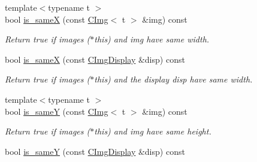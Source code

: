 \begin{DoxyCompactItemize}
\hypertarget{structcimg__library_1_1_c_img_af6159b79f4adb751936f93b5dd449ad0}{
{\footnotesize template$<$typename t $>$ }\\bool \hyperlink{structcimg__library_1_1_c_img_af6159b79f4adb751936f93b5dd449ad0}{is\_\-sameX} (const \hyperlink{structcimg__library_1_1_c_img}{CImg}$<$ t $>$ \&img) const }
\label{structcimg__library_1_1_c_img_af6159b79f4adb751936f93b5dd449ad0}

\begin{DoxyCompactList}\small\item\em Return {\ttfamily true} if images {\ttfamily }($\ast$this) and {\ttfamily img} have same width. \item\end{DoxyCompactList}\item 
\hypertarget{structcimg__library_1_1_c_img_af47030feb9d6fb87462ed939b7e45ea5}{
bool \hyperlink{structcimg__library_1_1_c_img_af47030feb9d6fb87462ed939b7e45ea5}{is\_\-sameX} (const \hyperlink{structcimg__library_1_1_c_img_display}{CImgDisplay} \&disp) const }
\label{structcimg__library_1_1_c_img_af47030feb9d6fb87462ed939b7e45ea5}

\begin{DoxyCompactList}\small\item\em Return {\ttfamily true} if images {\ttfamily }($\ast$this) and the display {\ttfamily disp} have same width. \item\end{DoxyCompactList}\item 
\hypertarget{structcimg__library_1_1_c_img_aad820536738d41afc41f67e50fba0237}{
{\footnotesize template$<$typename t $>$ }\\bool \hyperlink{structcimg__library_1_1_c_img_aad820536738d41afc41f67e50fba0237}{is\_\-sameY} (const \hyperlink{structcimg__library_1_1_c_img}{CImg}$<$ t $>$ \&img) const }
\label{structcimg__library_1_1_c_img_aad820536738d41afc41f67e50fba0237}

\begin{DoxyCompactList}\small\item\em Return {\ttfamily true} if images {\ttfamily }($\ast$this) and {\ttfamily img} have same height. \item\end{DoxyCompactList}\item 
\hypertarget{structcimg__library_1_1_c_img_aa686f35fb0e2a1d03ee7dc55fa97601d}{
bool \hyperlink{structcimg__library_1_1_c_img_aa686f35fb0e2a1d03ee7dc55fa97601d}{is\_\-sameY} (const \hyperlink{structcimg__library_1_1_c_img_display}{CImgDisplay} \&disp) const }
\label{structcimg__library_1_1_c_img_aa686f35fb0e2a1d03ee7dc55fa97601d}


\end{DoxyCompactItemize}
